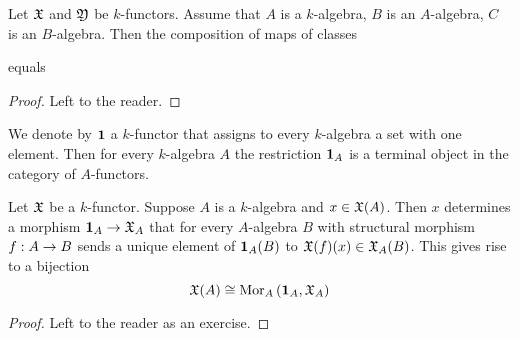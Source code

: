 \begin{fact}\label{fact:restrictionsworkasexpected}
Let ${\mathfrak X}$ and ${\mathfrak Y}$ be $k$-functors. Assume that $A$ is a $k$-algebra, $B$ is an $A$-algebra, $C$ is an $B$-algebra. Then the composition of maps of classes
\begin{center}
\end{center}
equals
\begin{center}
\end{center}
\end{fact}
\begin{proof}
Left to the reader.
\end{proof}
\noindent
We denote by $\mathbf{1}$ a $k$-functor that assigns to every $k$-algebra a set with one element. Then for every $k$-algebra $A$ the restriction $\mathbf{1}_A$ is a terminal object in the category of $A$-functors.

\begin{fact}\label{fact:points}
Let ${\mathfrak X}$ be a $k$-functor. Suppose $A$ is a $k$-algebra and $x\in {\mathfrak X}(A)$. Then $x$ determines a morphism $\mathbf{1}_{A}\rightarrow {\mathfrak X}_A$ that for every $A$-algebra $B$ with structural morphism $f:A\rightarrow B$ sends a unique element of $\mathbf{1}_{A}(B)$ to ${\mathfrak X}(f)(x)\in {\mathfrak X}_A(B)$. This gives rise to a bijection
$${\mathfrak X}(A)\cong \mathrm{Mor}_{A}\left(\mathbf{1}_{A},{\mathfrak X}_A\right)$$
\end{fact}
\begin{proof}
Left to the reader as an exercise.
\end{proof}

